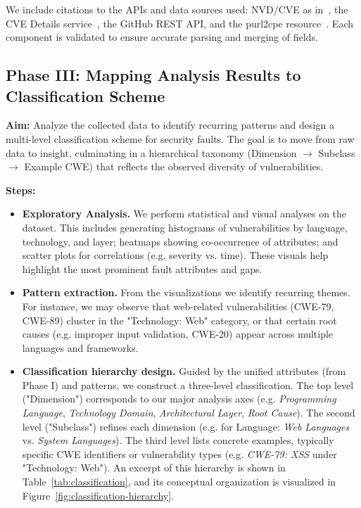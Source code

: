 We include citations to the APIs and data sources used: NVD/CVE as in~\cite{nvd_nist}, the CVE Details service~\cite{cve_details}, the GitHub REST API, and the purl2cpe resource~. Each component is validated to ensure accurate parsing and merging of fields.

\subsection{Phase III: Mapping Analysis Results to Classification Scheme} \textbf{Aim:} Analyze the collected data to identify recurring patterns and design a multi-level classification scheme for security faults. The goal is to move from raw data to insight, culminating in a hierarchical taxonomy (Dimension $\rightarrow$ Subclass $\rightarrow$ Example CWE) that reflects the observed diversity of vulnerabilities.
\newline

\textbf{Steps:}
\begin{itemize}
    \item \textbf{Exploratory Analysis.} We perform statistical and visual analyses on the dataset. This includes generating histograms of vulnerabilities by language, technology, and layer; heatmaps showing co-occurrence of attributes; and scatter plots for correlations (e.g. severity vs. time). These visuals help highlight the most prominent fault attributes and gaps.
    \item \textbf{Pattern extraction.} From the visualizations we identify recurring themes. For instance, we may observe that web-related vulnerabilities (CWE-79, CWE-89) cluster in the "Technology: Web" category, or that certain root causes (e.g. improper input validation, CWE-20) appear across multiple languages and frameworks.
    \item \textbf{Classification hierarchy design.} Guided by the unified attributes (from Phase I) and patterns, we construct a three-level classification. The top level ("Dimension") corresponds to our major analysis axes (e.g. {\em Programming Language}, {\em Technology Domain}, {\em Architectural Layer}, {\em Root Cause}). The second level ("Subclass") refines each dimension (e.g. for Language: {\em Web Languages} vs. {\em System Languages}). The third level lists concrete examples, typically specific CWE identifiers or vulnerability types (e.g. {\em CWE-79: XSS} under "Technology: Web"). An excerpt of this hierarchy is shown in Table~\ref{tab:classification}, and its conceptual organization is visualized in Figure~\ref{fig:classification-hierarchy}.
\end{itemize}

